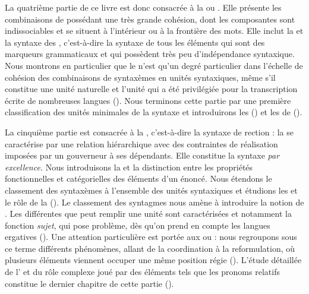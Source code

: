 La quatrième partie de ce livre est donc consacrée à la  ou . Elle présente les combinaisons de  possédant une très grande cohésion, dont les composantes sont indissociables et se situent à l’intérieur ou à la frontière des mots. Elle inclut la  et la syntaxe des , c’est-à-dire la syntaxe de tous les éléments qui sont des marqueurs grammaticaux et qui possèdent très peu d’indépendance syntaxique. Nous montrons en particulier que le  n’est qu’un degré particulier dans l’échelle de cohésion des combinaisons de syntaxèmes en unités syntaxiques, même s’il constitue une unité naturelle et l’unité qui a été privilégiée pour la transcription écrite de nombreuses langues (). Nous terminons cette partie par une première classification des unités minimales de la syntaxe et introduirons les  () et les  de  ().

La cinquième partie est consacrée à la , c’est-à-dire la syntaxe de rection : la  se caractérise par une relation hiérarchique avec des contraintes de réalisation imposées par un gouverneur à ses dépendants. Elle constitue la syntaxe \textit{par excellence.} Nous introduisons la  et la distinction entre les propriétés fonctionnelles et catégorielles des éléments d’un énoncé. Nous étendons le classement des syntaxèmes à l’ensemble des unités syntaxiques et étudions les  et le rôle de la  (). Le classement des syntagmes nous amène à introduire la notion de . Les différentes  que peut remplir une unité sont caractérisées et notamment la fonction \textit{sujet}, qui pose problème, dès qu’on prend en compte les langues ergatives (). Une attention particulière est portée aux  ou  : nous regroupons sous ce terme différents phénomènes, allant de la coordination à la reformulation, où plusieurs éléments viennent occuper une même position régie (). L’étude détaillée de l’ et du rôle complexe joué par des éléments tels que les pronoms relatifs constitue le dernier chapitre de cette partie ().

